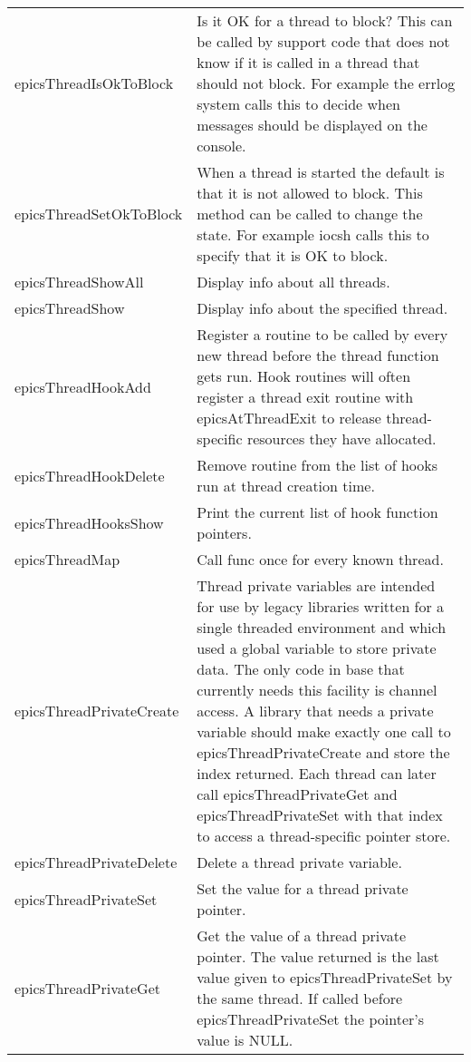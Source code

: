 \begin{center}
\begin{longtable}{p{2.375in}p{4.0in}}
epicsThreadIsOkToBlock &
Is it OK for a thread to block?
This can be called by support code that does not know if it is called in a thread that should not block.
For example the errlog system calls this to decide when messages should be displayed on the console.\\
epicsThreadSetOkToBlock &
When a thread is started the default is that it is not allowed to block.
This method can be called to change the state.
For example iocsh calls this to specify that it is OK to block.\\
epicsThreadShowAll &
Display info about all threads.\\
epicsThreadShow &
Display info about the specified thread.\\
epicsThreadHookAdd &
Register a routine to be called by every new thread before the thread function gets run.
Hook routines will often register a thread exit routine with epicsAtThreadExit to release thread-specific resources they have allocated.\\
epicsThreadHookDelete &
Remove routine from the list of hooks run at thread creation time.\\
epicsThreadHooksShow &
Print the current list of hook function pointers.\\
epicsThreadMap &
Call func once for every known thread.\\
epicsThreadPrivateCreate &
Thread private variables are intended for use by legacy libraries written for a single threaded environment and which used a global variable to store private data.
The only code in base that currently needs this facility is channel access.
A library that needs a private variable should make exactly one call to epicsThreadPrivateCreate and store the index returned.
Each thread can later call epicsThreadPrivateGet and epicsThreadPrivateSet with that index to access a thread-specific pointer store.\\
epicsThreadPrivateDelete &
Delete a thread private variable.\\
epicsThreadPrivateSet &
Set the value for a thread private pointer.\\
epicsThreadPrivateGet &
Get the value of a thread private pointer.
The value returned is the last value given to epicsThreadPrivateSet by the same thread.
If called before epicsThreadPrivateSet the pointer's value is NULL.\\
\end{longtable}

\end{center}


